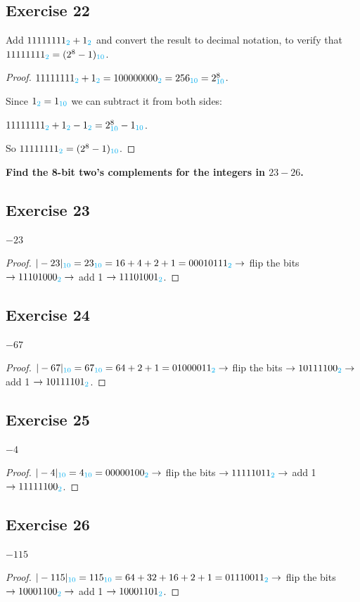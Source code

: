\documentclass[14pt]{extarticle}
\newcommand{\base}[1]{{\color{cyan}#1}} \newcommand{\da}{\downarrow}
\begin{document}
\subsection{Exercise 22} Add $11111111_\base{2} + 1_\base{2}$ and convert the
result to decimal notation, to verify that \\ $11111111_\base{2} = (2^8 -
1)_\base{10}$.

\begin{proof} $11111111_\base{2} + 1_\base{2} = 100000000_\base{2} =
256_\base{10} = 2^8_\base{10}$.

Since $1_\base{2} = 1_\base{10}$ we can subtract it from both sides:

$11111111_\base{2} + 1_\base{2} - 1_\base{2} = 2^8_\base{10} - 1_\base{10}$.

So $11111111_\base{2} = (2^8 - 1)_\base{10}$. \end{proof}
{\bf\color{cyan} Find the 8-bit two’s complements for the integers in $23-26$.}

\subsection{Exercise 23} $-23$
\begin{proof} $|-23|_\base{10} = 23_\base{10} = 16 + 4 + 2 + 1 =
00010111_\base{2} \to$ flip the bits $\to 11101000_\base{2} \to$ add 1 $\to
11101001_\base{2}$. \end{proof}

\subsection{Exercise 24} $-67$
\begin{proof} $|-67|_\base{10} = 67_\base{10} = 64 + 2 + 1 = 01000011_\base{2}
\to$ flip the bits $\to 10111100_\base{2} \to$ add 1 $\to 10111101_\base{2}$.
\end{proof}

\subsection{Exercise 25} $-4$
\begin{proof} $|-4|_\base{10} = 4_\base{10} = 00000100_\base{2} \to$ flip the
bits $\to 11111011_\base{2} \to$ add 1 $\to 11111100_\base{2}$. \end{proof}

\subsection{Exercise 26} $-115$
\begin{proof} $|-115|_\base{10} = 115_\base{10} = 64 + 32 + 16 + 2 + 1 =
01110011_\base{2} \to$ flip the bits $\to 10001100_\base{2} \to$ add 1 $\to
10001101_\base{2}$. \end{proof}
\end{document}
